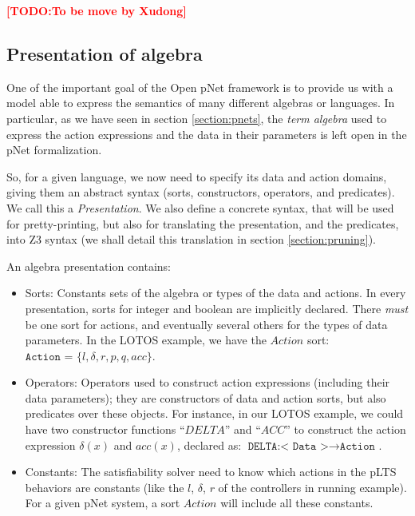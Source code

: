 \documentclass{lncs/llncs}
\newcommand{\TODO}[1]{\textcolor{red}{\textbf{[TODO:#1]}}}
\newcommand{\OTvar}{\texttt}
\begin{document}
\TODO{To be move  by Xudong}

\subsection{Presentation of algebra}
One of the important goal of the Open pNet framework is to provide us
with a model able to express the semantics of many different algebras
or languages. In particular, as we have seen in section
\ref{section:pnets}, the \emph{term algebra} used to express the
action expressions and the data in their parameters is left open in
the pNet formalization.

So, for a given language, we now need to specify its data and action
domains, giving them an abstract syntax (sorts, constructors, operators,
and predicates). We call this a \emph{Presentation}.
We also define a concrete syntax, that will be used for
pretty-printing, but also for translating the presentation, and the
predicates, into Z3 syntax (we shall detail this translation in
section \ref{section:pruning}).

An algebra presentation contains:
\begin{itemize}
	\item Sorts: Constants sets of the algebra or types of the data
          and actions. In every presentation, sorts for integer and
          boolean are implicitly declared.  There \emph{must} be one sort for actions, and eventually 
several others for the types of data parameters. In the LOTOS example,
we have the $Action$ sort: $\OTvar{Action = } \{ l, \delta, r, p, q, acc \} .$

	\item Operators: Operators used to construct action
          expressions (including their data parameters); they are
          constructors of data and action sorts, but also predicates
          over these objects. For instance, in our LOTOS example, we
          could have two constructor functions ``$DELTA$'' and ``$ACC$''
          to construct the action expression $\delta(x)$ and $acc(x)$, declared as:
          $\OTvar{DELTA:}\OTvar{< Data >} \rightarrow \OTvar{Action .}$
        \item Constants: The satisfiability solver need to know which
          actions in the pLTS behaviors are constants (like the $l$, $\delta$, 
          $r$ of the controllers in running example). 
          For a given pNet system, a sort $Action$ will include all
          these constants.
\end{itemize}
\end{document}
